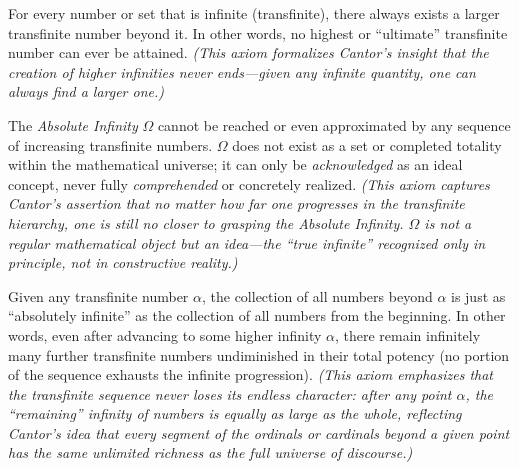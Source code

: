\begin{axiom}
\label{cantor1897:axiom1}
For every number or set that is infinite (transfinite), there always exists a larger transfinite number beyond it. In other words, no highest or “ultimate” transfinite number can ever be attained. \textit{(This axiom formalizes Cantor’s insight that the creation of higher infinities never ends—given any infinite quantity, one can always find a larger one.)}
\end{axiom}

\begin{axiom}
\label{cantor1897:axiom2}
The \emph{Absolute Infinity} $\Omega$ cannot be reached or even approximated by any sequence of increasing transfinite numbers. $\Omega$ does not exist as a set or completed totality within the mathematical universe; it can only be \emph{acknowledged} as an ideal concept, never fully \emph{comprehended} or concretely realized. \textit{(This axiom captures Cantor’s assertion that no matter how far one progresses in the transfinite hierarchy, one is still no closer to grasping the Absolute Infinity. $\Omega$ is not a regular mathematical object but an idea—the “true infinite” recognized only in principle, not in constructive reality.)}
\end{axiom}

\begin{axiom}
\label{cantor1897:axiom3}
Given any transfinite number $\alpha$, the collection of all numbers beyond $\alpha$ is just as “absolutely infinite” as the collection of all numbers from the beginning. In other words, even after advancing to some higher infinity $\alpha$, there remain infinitely many further transfinite numbers undiminished in their total potency (no portion of the sequence exhausts the infinite progression). \textit{(This axiom emphasizes that the transfinite sequence never loses its endless character: after any point $\alpha$, the “remaining” infinity of numbers is equally as large as the whole, reflecting Cantor’s idea that every segment of the ordinals or cardinals beyond a given point has the same unlimited richness as the full universe of discourse.)}
\end{axiom}

